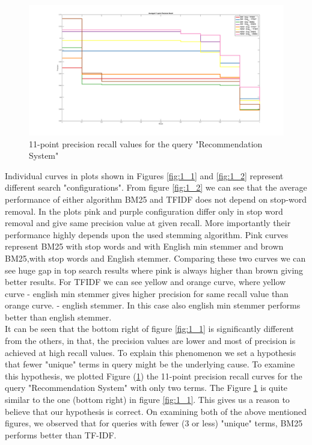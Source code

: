 \documentclass[report,draft*]{aaltoseries}
\begin{document}
\begin{figure}[ht!]
\centering
\includegraphics[scale=0.15]{recommendationSystems.png}
\caption{11-point precision recall values for the query "Recommendation System"}
\label{fig:recommendationSystem}
\end{figure}
Individual curves in plots shown in Figures \ref{fig:1_1} and \ref{fig:1_2} represent different search "configurations". From figure \ref{fig:1_2} we can see that the average performance of either algorithm BM25 and TFIDF does not depend on stop-word removal. In the plots pink and purple configuration differ only in stop word removal and give same precision value at given recall. More importantly their performance highly depends upon the used stemming algorithm. Pink curves represent BM25 with stop words and with English min stemmer and brown BM25,with stop words and English stemmer. Comparing these two curves we can see huge gap in top search results where pink is always higher than brown giving better results. For TFIDF we can see  yellow and orange curve, where yellow curve - english min stemmer  gives higher precision for same recall value than orange curve. - english stemmer. In this case also english min stemmer performs better than english stemmer.  \\It can be seen that the bottom right of figure \ref{fig:1_1} is significantly different from the others, in that, the precision values are lower and most of precision is achieved at high recall values. To explain this phenomenon we set a hypothesis that fewer "unique" terms in query might be the underlying cause. To examine this hypothesis, we plotted Figure (\ref{fig:recommendationSystem}) the 11-point precision recall curves for the query "Recommendation System" with only two terms.
The Figure \ref{fig:recommendationSystem} is quite similar to the one (bottom right) in figure \ref{fig:1_1}. This gives us a reason to believe that our hypothesis is correct. %
On examining both of the above mentioned figures, we observed that for queries with fewer (3 or less) "unique" terms, BM25 performs better than TF-IDF. %
\end{document}
